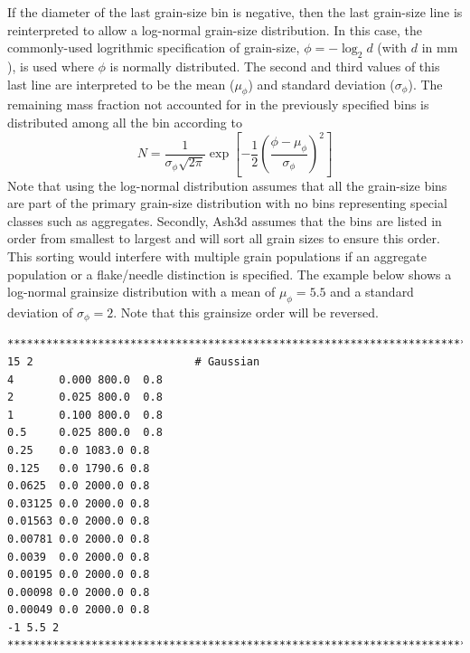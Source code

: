 If the diameter of the last grain-size bin is negative, then the last grain-size line
is reinterpreted to allow a log-normal grain-size distribution.
In this case, the commonly-used logrithmic specification of grain-size,
$\phi=-\log_2 d$ (with $d$ in $\mathrm{mm}$), is used where $\phi$ is normally
distributed.
The second and third values of this last line
are interpreted to be the mean ($\mu_{\phi}$)
and standard deviation ($\sigma_{\phi}$).
The remaining mass fraction not accounted for in the previously specified
bins is distributed among all the bin according to 
\begin{equation}
N=\frac{1}{\sigma_{\phi} \sqrt{2 \pi}}
\exp{\left[-\frac{1}{2} \left(  \frac{\phi-\mu_{\phi}}{\sigma_{\phi}}  \right)^2 \right]}
\end{equation}
Note that using the log-normal distribution assumes that all the grain-size bins
are part of the primary grain-size distribution with no bins representing special
classes such as aggregates. Secondly, Ash3d assumes that the bins are listed in
order from smallest to largest and will sort all grain sizes to ensure this order.
This sorting would interfere with multiple grain populations if an aggregate
population or a flake/needle distinction is specified. The example below shows
a log-normal grainsize distribution with a mean of $\mu_{\phi}=5.5$ and a standard
deviation of $\sigma_{\phi}=2$. Note that this grainsize order will be reversed.
\small
\begin{verbatim}
*******************************************************************************
15 2                         # Gaussian
4       0.000 800.0  0.8
2       0.025 800.0  0.8
1       0.100 800.0  0.8
0.5     0.025 800.0  0.8
0.25    0.0 1083.0 0.8
0.125   0.0 1790.6 0.8
0.0625  0.0 2000.0 0.8
0.03125 0.0 2000.0 0.8
0.01563 0.0 2000.0 0.8
0.00781 0.0 2000.0 0.8
0.0039  0.0 2000.0 0.8
0.00195 0.0 2000.0 0.8
0.00098 0.0 2000.0 0.8
0.00049 0.0 2000.0 0.8
-1 5.5 2
*******************************************************************************
\end{verbatim}
\normalsize

